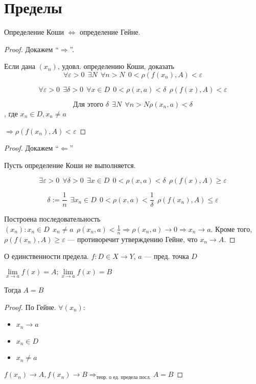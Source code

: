 

\cfoot{}



\section{Пределы}

\begin{theorem}
    Определение Коши $\Leftrightarrow$ определение Гейне.
\end{theorem}
\begin{proof}
    Докажем ``$\Rightarrow$''.

    Если дана $(x_n)$, удовл. определению Коши, доказать $$\forall \varepsilon>0 \ \ \exists N \ \ \forall n > N \ \ 0<\rho(f(x_n), A)<\varepsilon$$

    $$\forall \varepsilon>0 \ \ \exists \delta>0 \ \ \forall x \in D \ \ 0<\rho(x, a)<\delta \ \ \rho(f(x), A)<\varepsilon$$

    $$\text{Для этого } \delta \ \ \exists N \ \ \forall n>N \rho(x_n,a)<\delta$$, где $x_n\in D, x_n\not = a$

    $\Rightarrow \rho(f(x_n), A)<\varepsilon$
\end{proof}
\begin{proof}
    Докажем ``$\Leftarrow$''

    Пусть определение Коши не выполняется.

    $$\exists \varepsilon>0 \ \ \forall \delta>0 \ \ \exists x\in D \ \ 0<\rho(x,a)<\delta \ \ \rho(f(x), A)\geq \varepsilon$$

    $$\delta:=\frac{1}{n} \ \ \exists x_n\in D \ \ 0<\rho(x,a)<\frac{1}{\delta} \ \ \rho(f(x_n), A)\leq\varepsilon$$

    Построена последовательность $(x_n): x_n\in D \ \ x_n\not = a \ \ \rho(x_n, a)<\frac{1}{n} \Rightarrow \rho(x_n, a)\to 0 \Rightarrow x_n\to a$. Кроме того, $\rho(f(x_n), A)\geq \varepsilon$ --- противоречит утверждению Гейне, что $x_n\to A$.
\end{proof}

\begin{theorem}
    О единственности предела.
    $f: D\in X\to Y$, $a$ --- пред. точка $D$

    $\lim\limits_{x\to a} f(x)=A; \lim\limits_{x\to a} f(x)=B$

    Тогда $A=B$
\end{theorem}
\begin{proof}
    По Гейне.
    $\forall (x_n):$
    \begin{itemize}
        \itemsep0em
        \item $x_n\to a$
        \item $x_n\in D$
        \item $x_n\not=a$
    \end{itemize}
    
    $f(x_n)\to A, f(x_n)\to B \Rightarrow_{\text{теор. о ед. предела посл.}} A=B$
\end{proof}

